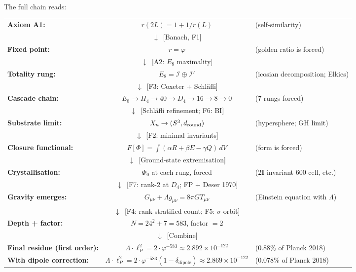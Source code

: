 \documentclass[11pt]{article}
\theoremstyle{plain}
\theoremstyle{definition}
\theoremstyle{remark}
\newcommand{\twoI}{2\mathbf{I}}
\begin{document}
The full chain reads:
\begin{center}
\renewcommand{\arraystretch}{1.3}
\begin{tabular}{lcl}
\textbf{Axiom A1:} & $r(2L) = 1 + 1/r(L)$ & (self-similarity) \\
& $\downarrow$ \,[Banach, F1] & \\
\textbf{Fixed point:} & $r = \varphi$ & (golden ratio is forced) \\
& $\downarrow$ \,[A2: $E_8$ maximality] & \\
\textbf{Totality rung:} & $E_8 = \mathcal{I} \oplus \mathcal{I}'$ & (icosian decomposition; Elkies) \\
& $\downarrow$ \,[F3: Coxeter + Schl\"afli] & \\
\textbf{Cascade chain:} & $E_8 \to H_4 \to 40 \to D_4 \to 16 \to 8 \to 0$ & (7 rungs forced) \\
& $\downarrow$ \,[Schl\"afli refinement; F6: BI] & \\
\textbf{Substrate limit:} & $X_n \to (S^3, d_{\rm round})$ & (hypersphere; GH limit) \\
& $\downarrow$ \,[F2: minimal invariants] & \\
\textbf{Closure functional:} & $F[\Phi] = \int (\alpha R + \beta E - \gamma Q)\,dV$ & (form is forced) \\
& $\downarrow$ \,[Ground-state extremisation] & \\
\textbf{Crystallisation:} & $\Phi_0$ at each rung, forced & ($\twoI$-invariant 600-cell, etc.) \\
& $\downarrow$ \,[F7: rank-2 at $D_4$; FP + Deser 1970] & \\
\textbf{Gravity emerges:} & $G_{\mu\nu} + \Lambda g_{\mu\nu} = 8\pi G T_{\mu\nu}$ & (Einstein equation with $\Lambda$) \\
& $\downarrow$ \,[F4: rank-stratified count; F5: $\sigma$-orbit] & \\
\textbf{Depth + factor:} & $N = 24^2 + 7 = 583$, factor $= 2$ & \\
& $\downarrow$ \,[Combine] & \\
\textbf{Final residue (first order):} & $\Lambda \cdot \ell_P^2 = 2 \cdot \varphi^{-583} \approx 2.892 \times 10^{-122}$ & ($0.88\%$ of Planck 2018) \\
\textbf{With dipole correction:} & $\Lambda \cdot \ell_P^2 = 2 \cdot \varphi^{-583}(1-\delta_\mathrm{dipole}) \approx 2.869 \times 10^{-122}$ & ($0.078\%$ of Planck 2018) \\
\end{tabular}
\end{center}
\end{document}
